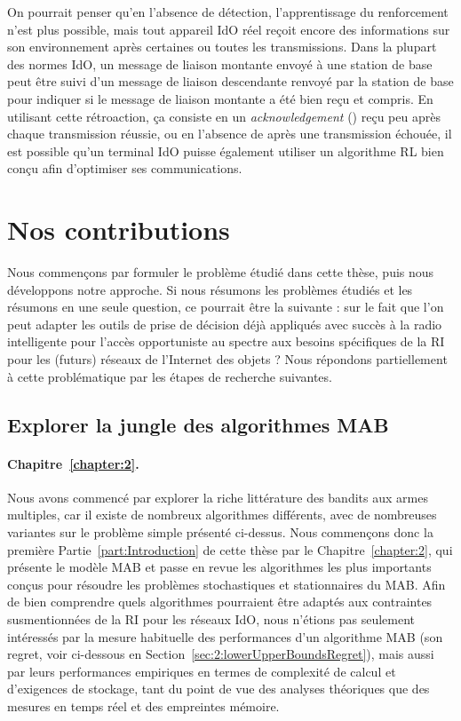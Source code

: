 \begin{resume_fr}
On pourrait penser qu'en l'absence de détection, l'apprentissage du renforcement n'est plus possible, mais tout appareil IdO réel reçoit encore des informations sur son environnement après certaines ou toutes les transmissions.
Dans la plupart des normes IdO, un message de liaison montante envoyé à une station de base peut être suivi d'un message de liaison descendante renvoyé par la station de base pour indiquer si le message de liaison montante a été bien reçu et compris.
%
En utilisant cette rétroaction, ça consiste en un \emph{acknowledgement} (\Ack) reçu peu après chaque transmission réussie, ou en l'absence de \Ack{} après une transmission échouée, il est possible qu'un terminal IdO puisse également utiliser un algorithme RL bien conçu afin d'optimiser ses communications.



\section*{Nos contributions}
\label{sec:1:contributions}

Nous commençons par formuler le problème étudié dans cette thèse, puis nous développons notre approche.
%
Si nous résumons les problèmes étudiés et les résumons en une seule question, ce pourrait être la suivante :
\Insister sur le fait que l'on peut adapter les outils de prise de décision déjà appliqués avec succès à la radio intelligente pour l'accès opportuniste au spectre aux besoins spécifiques de la RI pour les (futurs) réseaux de l'Internet des objets ?
%
Nous répondons partiellement à cette problématique par les étapes de recherche suivantes.



\subsection*{Explorer la jungle des algorithmes MAB}

\paragraph{Chapitre~\ref{chapter:2}.}
%
Nous avons commencé par explorer la riche littérature des bandits aux armes multiples,
car il existe de nombreux algorithmes différents, avec de nombreuses variantes sur le problème simple présenté ci-dessus.
Nous commençons donc la première Partie~\ref{part:Introduction} de cette thèse par le Chapitre~\ref{chapter:2}, qui présente le modèle MAB et passe en revue les algorithmes les plus importants conçus pour résoudre les problèmes stochastiques et stationnaires du MAB.
%
Afin de bien comprendre quels algorithmes pourraient être adaptés aux contraintes susmentionnées de la RI pour les réseaux IdO,
nous n'étions pas seulement intéressés par la mesure habituelle des performances d'un algorithme MAB (son regret, voir ci-dessous en Section~\ref{sec:2:lowerUpperBoundsRegret}),
mais aussi par leurs performances empiriques en termes de complexité de calcul et d'exigences de stockage, tant du point de vue des analyses théoriques que des mesures en temps réel et des empreintes mémoire.



\end{resume_fr}
